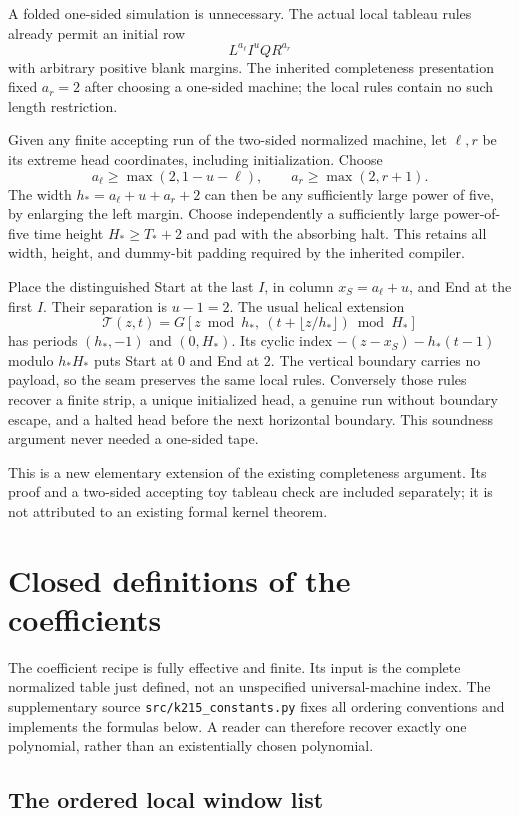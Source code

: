 \documentclass[11pt]{article}
\theoremstyle{remark}\newtheorem{remark}[theorem]{Remark}
\begin{document}
A folded one-sided simulation is unnecessary. The actual local
tableau rules already permit an initial row
\[
 L^{a_\ell} I^u Q R^{a_r}
\]
with arbitrary positive blank margins. The inherited completeness
presentation fixed $a_r=2$ after choosing a one-sided machine; the
local rules contain no such length restriction.

Given any finite accepting run of the two-sided normalized machine,
let $\ell,r$ be its extreme head coordinates, including initialization.
Choose
\[
 a_\ell\ge\max(2,1-u-\ell),\qquad
 a_r\ge\max(2,r+1).
\]
The width $h_*=a_\ell+u+a_r+2$ can then be any sufficiently large
power of five, by enlarging the left margin. Choose independently
a sufficiently large power-of-five time height $H_*\ge T_*+2$ and
pad with the absorbing halt. This retains all width, height, and
dummy-bit padding required by the inherited compiler.

Place the distinguished Start at the last $I$, in column
$x_S=a_\ell+u$, and End at the first $I$. Their separation is $u-1=2$.
The usual helical extension
\[
 \mathcal T(z,t)=G[z\bmod h_*,\ (t+\lfloor z/h_*\rfloor)\bmod H_*]
\]
has periods $(h_*,-1)$ and $(0,H_*)$. Its cyclic index
$-(z-x_S)-h_*(t-1)$ modulo $h_*H_*$ puts Start at $0$ and End at $2$.
The vertical boundary carries no payload, so the seam preserves the
same local rules. Conversely those rules recover a finite strip,
a unique initialized head, a genuine run without boundary escape,
and a halted head before the next horizontal boundary. This
soundness argument never needed a one-sided tape.

This is a new elementary extension of the existing completeness
argument. Its proof and a two-sided accepting toy tableau check are
included separately; it is not attributed to an existing formal
kernel theorem.

\section{Closed definitions of the coefficients}\label{sec:constants}

The coefficient recipe is fully effective and finite. Its input is
the complete normalized table just defined, not an unspecified
universal-machine index. The supplementary source
\texttt{src/k215\_constants.py} fixes all ordering conventions and
implements the formulas below. A reader can therefore recover exactly
one polynomial, rather than an existentially chosen polynomial.

\subsection{The ordered local window list}
\end{document}
